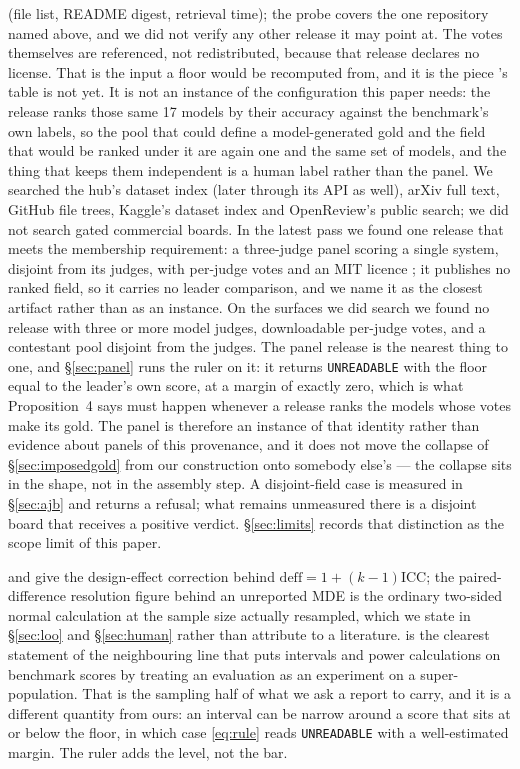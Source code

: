 \documentclass{article}
\begin{document}
\begin{description}
(file list, README digest, retrieval time); the probe covers the one repository named above, and we did not verify any other release it may point at. The votes themselves are referenced, not redistributed, because that release declares no license. That is the input a floor would be recomputed from, and it is the piece \cite{liu2025imperfect}'s table is not yet. It is not an instance of the configuration this paper needs: the release ranks those same 17 models by their accuracy against the benchmark's own labels, so the pool that could define a model-generated gold and the field that would be ranked under it are again one and the same set of models, and the thing that keeps them independent is a human label rather than the panel. We searched the hub's dataset index (later through its API as well), arXiv full text, GitHub file trees, Kaggle's dataset index and OpenReview's public search; we did not search gated commercial boards. In the latest pass we found one release that meets the membership requirement: a three-judge panel scoring a single system, disjoint from its judges, with per-judge votes and an {MIT} licence \cite{localgate2026judgepanel}; it publishes no ranked field, so it carries no leader comparison, and we name it as the closest artifact rather than as an instance. On the surfaces we did search we found no release with three or more model judges, downloadable per-judge votes, and a contestant pool disjoint from the judges. The panel release is the nearest thing to one, and \S\ref{sec:panel} runs the ruler on it: it returns \texttt{UNREADABLE} with the floor equal to the leader's own score, at a margin of exactly zero, which is what Proposition~4 says must happen whenever a release ranks the models whose votes make its gold. The panel is therefore an instance of that identity rather than evidence about panels of this provenance, and it does not move the collapse of \S\ref{sec:imposedgold} from our construction onto somebody else's --- the collapse sits in the shape, not in the assembly step. A disjoint-field case is measured in \S\ref{sec:ajb} and returns a refusal; what remains unmeasured there is a disjoint board that receives a positive verdict. \S\ref{sec:limits} records that distinction as the scope limit of this paper.
\item[Power-resolution bound.] \cite{camerongelbachmiller2007} and \cite{abadie2022clustering} give the design-effect correction behind $\mathrm{deff}=1+(k-1)\mathrm{ICC}$; the paired-difference resolution figure behind an unreported MDE is the ordinary two-sided normal calculation at the sample size actually resampled, which we state in \S\ref{sec:loo} and \S\ref{sec:human} rather than attribute to a literature. \cite{miller2024errorbars} is the clearest statement of the neighbouring line that puts intervals and power calculations on benchmark scores by treating an evaluation as an experiment on a super-population. That is the sampling half of what we ask a report to carry, and it is a different quantity from ours: an interval can be narrow around a score that sits at or below the floor, in which case \eqref{eq:rule} reads \texttt{UNREADABLE} with a well-estimated margin. The ruler adds the level, not the bar.

\end{description}
\end{document}
